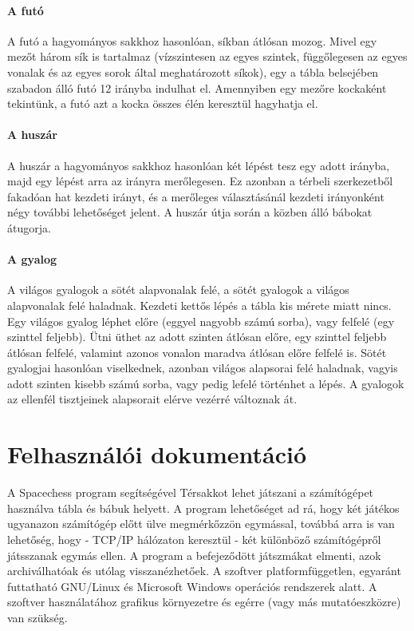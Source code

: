 \documentclass[12pt, twoside]{report}
\begin{document}
\subsubsection{A futó}

A futó a hagyományos sakkhoz hasonlóan, síkban átlósan mozog. Mivel egy mezőt három sík is tartalmaz (vízszintesen az egyes szintek, függőlegesen az egyes vonalak és az egyes sorok által meghatározott síkok), egy a tábla belsejében szabadon álló futó 12 irányba indulhat el. Amennyiben egy mezőre kockaként tekintünk, a futó azt a kocka összes élén keresztül hagyhatja el. 

\subsubsection{A huszár}

A huszár a hagyományos sakkhoz hasonlóan két lépést tesz egy adott irányba, majd egy lépést arra az irányra merőlegesen. Ez azonban a térbeli szerkezetből fakadóan hat kezdeti irányt, és a merőleges választásánál kezdeti irányonként négy további lehetőséget jelent. A huszár útja során a közben álló bábokat átugorja. 

\subsubsection{A gyalog}

A világos gyalogok a sötét alapvonalak felé, a sötét gyalogok a világos alapvonalak felé haladnak. Kezdeti kettős lépés a tábla kis mérete miatt nincs. Egy világos gyalog léphet előre (eggyel nagyobb számú sorba), vagy felfelé (egy szinttel feljebb). Ütni üthet az adott szinten átlósan előre, egy szinttel feljebb átlósan felfelé, valamint azonos vonalon maradva átlósan előre felfelé is. Sötét gyalogjai hasonlóan viselkednek, azonban világos alapsorai felé haladnak, vagyis adott szinten kisebb számú sorba, vagy pedig lefelé történhet a lépés. A gyalogok az ellenfél tisztjeinek alapsorait elérve vezérré változnak át.

\chapter{Felhasználói dokumentáció}

A Spacechess program segítségével Térsakkot lehet játszani a számítógépet használva tábla és bábuk helyett. A program lehetőséget ad rá, hogy két játékos ugyanazon számítógép előtt ülve megmérkőzzön egymással, továbbá arra is van lehetőség, hogy - TCP/IP hálózaton keresztül - két különböző számítógépről játsszanak egymás ellen. A program a befejeződött játszmákat elmenti, azok archiválhatóak és utólag visszanézhetőek. A szoftver platformfüggetlen, egyaránt futtatható GNU/Linux és Microsoft Windows operációs rendszerek alatt. A szoftver használatához grafikus környezetre és egérre (vagy más mutatóeszközre) van szükség.
\end{document}
